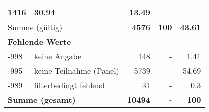 \begin{longtable}{lXrrr}
       \num{1416} &
       \num[round-mode=places,round-precision=2]{30,94} &
         \num[round-mode=places,round-precision=2]{13,49} \\
     \midrule
     \multicolumn{2}{l}{Summe (gültig)} &
       \textbf{\num{4576}} &
     \textbf{100} &
       \textbf{\num[round-mode=places,round-precision=2]{43,61}} \\
     \multicolumn{5}{l}{\textbf{Fehlende Werte}}\\
       -998 &
       keine Angabe &
         \num{148} &
        - &
         \num[round-mode=places,round-precision=2]{1,41} \\
       -995 &
       keine Teilnahme (Panel) &
         \num{5739} &
        - &
         \num[round-mode=places,round-precision=2]{54,69} \\
       -989 &
       filterbedingt fehlend &
         \num{31} &
        - &
         \num[round-mode=places,round-precision=2]{0,3} \\
     \midrule
     \multicolumn{2}{l}{\textbf{Summe (gesamt)}} &
          \textbf{\num{10494}} &
        \textbf{-} &
        \textbf{100} \\
     \bottomrule
     \end{longtable}
     

